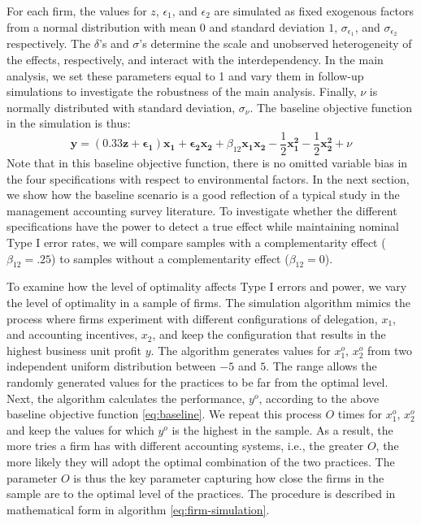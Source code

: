 \documentclass[12pt]{article}
\begin{document}
For each firm, the values for $z$, $\epsilon_1$, and $\epsilon_2$ are simulated as fixed exogenous factors from a normal distribution with mean $0$ and standard deviation $1$,  $\sigma_{\epsilon_1}$, and $\sigma_{\epsilon_2}$ respectively. The $\delta$'s and $\sigma$'s determine the scale and unobserved heterogeneity of the effects, respectively, and interact with the interdependency. In the main analysis, we set these parameters equal to 1 and vary them in follow-up simulations to investigate the robustness of the main analysis. Finally, $\nu$ is normally distributed with standard deviation, $\sigma_{\nu}$. The baseline objective function in the simulation is thus:
\begin{equation}\label{eq:baseline}
\mathbf{y}  = (0.33 \mathbf{z} + \mathbf{\epsilon_1}) \mathbf{x_1} 
						+ \mathbf{\epsilon_2} \mathbf{x_2} 
                        + \beta_{12} \mathbf{x_1} \mathbf{x_2} 
                        - \frac{1}{2}\mathbf{x^2_1} - \frac{1}{2}\mathbf{x^2_2} + \nu
\end{equation}
Note that in this baseline objective function, there is no omitted variable bias in the four specifications with respect to environmental factors. In the next section, we show how the baseline scenario is a good reflection of a typical study in the management accounting survey literature. To investigate whether the different specifications have the power to detect a true effect while maintaining nominal Type I error rates, we will compare samples with a complementarity effect ($\beta_{12} = .25$) to samples without a complementarity effect ($\beta_{12} = 0$).

To examine how the level of optimality affects Type I errors and power, we vary the level of optimality in a sample of firms. The simulation algorithm mimics the process where firms experiment with different configurations of delegation, $x_1$,  and accounting incentives, $x_2$, and keep the configuration that results in the highest business unit profit $y$. The algorithm generates values for $x^o_{1}$, $x^o_{2}$ from two independent uniform distribution between $-5$ and $5$. The range allows the randomly generated values for the practices to be far from the optimal level. Next, the algorithm calculates the performance, $y^o$, according to the above baseline objective function \eqref{eq:baseline}. We repeat this process $O$ times for $x^o_{1}$, $x^o_{2}$ and keep the values for which $y^o$ is the highest in the sample. As a result, the more tries a firm has with different accounting systems, i.e., the greater $O$, the more likely they will adopt the optimal combination of the two practices. The parameter $O$ is thus the key parameter capturing how close the firms in the sample are to the optimal level of the practices. The procedure is described in mathematical form in algorithm \eqref{eq:firm-simulation}. 
\end{document}
